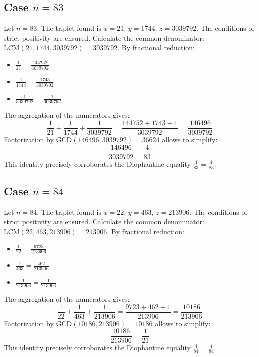 \documentclass[11pt,a4paper]{article}
\begin{document}
\subsection{Case $n = 83$}
Let $n = 83$. The triplet found is $x = 21$, $y = 1744$, $z = 3039792$.
The conditions of strict positivity are ensured.
Calculate the common denominator: $\text{LCM}(21, 1744, 3039792) = 3039792$.
By fractional reduction:
\begin{itemize}
    \item $\frac{1}{21} = \frac{144752}{3039792}$
    \item $\frac{1}{1744} = \frac{1743}{3039792}$
    \item $\frac{1}{3039792} = \frac{1}{3039792}$
\end{itemize}
The aggregation of the numerators gives:
$$ \frac{1}{21} + \frac{1}{1744} + \frac{1}{3039792} = \frac{144752 + 1743 + 1}{3039792} = \frac{146496}{3039792} $$
Factorization by $\text{GCD}(146496, 3039792) = 36624$ allows to simplify:
$$ \frac{146496}{3039792} = \frac{4}{83} $$
This identity precisely corroborates the Diophantine equality $\frac{4}{83} = \frac{4}{83}$.

\subsection{Case $n = 84$}
Let $n = 84$. The triplet found is $x = 22$, $y = 463$, $z = 213906$.
The conditions of strict positivity are ensured.
Calculate the common denominator: $\text{LCM}(22, 463, 213906) = 213906$.
By fractional reduction:
\begin{itemize}
    \item $\frac{1}{22} = \frac{9723}{213906}$
    \item $\frac{1}{463} = \frac{462}{213906}$
    \item $\frac{1}{213906} = \frac{1}{213906}$
\end{itemize}
The aggregation of the numerators gives:
$$ \frac{1}{22} + \frac{1}{463} + \frac{1}{213906} = \frac{9723 + 462 + 1}{213906} = \frac{10186}{213906} $$
Factorization by $\text{GCD}(10186, 213906) = 10186$ allows to simplify:
$$ \frac{10186}{213906} = \frac{1}{21} $$
This identity precisely corroborates the Diophantine equality $\frac{4}{84} = \frac{4}{84}$.
\end{document}
